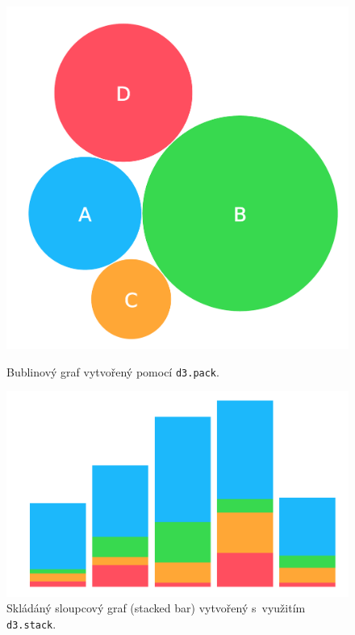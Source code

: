 \documentclass[
  digital, %
  oneside, %
  table,   %
  nolof,     %
  nolot,     %
]{fithesis3}
\begin{document}
\begin{figure}[H]
  \RawFloats
  \centering
  \begin{minipage}[b]{0.35\textwidth}
  	\centering
    \includegraphics[width=\textwidth]{images/bubble.pdf}
    \caption{Bublinový graf vytvořený pomocí \texttt{d3.pack}.}
    \label{fig:bubbleChart}
  \end{minipage}
  \hfill
  \begin{minipage}[b]{0.5\textwidth}
    \includegraphics[width=\textwidth]{images/stack.pdf}
    \caption{Skládáný sloupcový graf (stacked bar) vytvořený s~využitím \texttt{d3.stack}.}
    \label{fig:stackBarChart}
  \end{minipage}
\end{figure}
\end{document}
